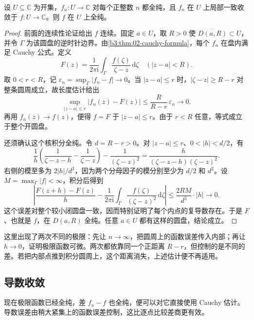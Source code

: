 \begin{proposition}\label{b3:prop:04-holomorphic-limit}
设 \(U\subseteq\mathbb C\) 为开集，\(f_n:U\to\mathbb C\) 对每个正整数 \(n\) 都全纯，且 \(f_n\) 在 \(U\) 上局部一致收敛于 \(f:U\to\mathbb C\)。则 \(f\) 在 \(U\) 上全纯。
\end{proposition}
\begin{proof}
前面的连续性论证给出 \(f\) 连续。固定 \(a\in U\)，取 \(R>0\) 使 \(\overline{D(a,R)}\subset U\)，并令 \(\Gamma\) 为该圆盘的逆时针边界。由\cref{b3:thm:02-cauchy-formula}，每个 \(f_n\) 在盘内满足 Cauchy 公式。定义
\[
 F(z)=\frac1{2\pi\mathrm{i}}\int_\Gamma
              \frac{f(\zeta)}{\zeta-z}\,\mathrm{d}\zeta
 \quad(|z-a|<R).
\]
取 \(0<r<R\)，记 \(\varepsilon_n=\sup_\Gamma|f_n-f|\to0\)。当 \(|z-a|\le r\) 时，\(|\zeta-z|\ge R-r\) 对整条圆周成立，故长度估计给出
\[
 \sup_{|z-a|\le r}|f_n(z)-F(z)|
 \le\frac{R}{R-r}\,\varepsilon_n\longrightarrow0.
\]
再用 \(f_n(z)\to f(z)\)，便得 \(f=F\) 于 \(|z-a|\le r\)。由于 \(r<R\) 任意，等式成立于整个开圆盘。

还须确认这个核积分全纯。令 \(d=R-r>0\)。对 \(|z-a|\le r\)、\(0<|h|<d/2\)，有
\[
 \frac1h\left(\frac1{\zeta-z-h}-\frac1{\zeta-z}\right)
       -\frac1{(\zeta-z)^2}
 =\frac{h}{(\zeta-z-h)(\zeta-z)^2}.
\]
右侧的模至多为 \(2|h|/d^3\)，因为两个分母因子的模分别至少为 \(d/2\) 和 \(d^2\)。设 \(M=\max_\Gamma|f|<\infty\)，积分后得到
\[
 \left|\frac{F(z+h)-F(z)}h
       -\frac1{2\pi\mathrm{i}}\int_\Gamma
                \frac{f(\zeta)}{(\zeta-z)^2}\,\mathrm{d}\zeta\right|
 \le\frac{2RM}{d^3}\cdot|h|\longrightarrow0.
\]
这个误差对整个较小闭圆盘一致，因而特别证明了每个内点的复导数存在。于是 \(F\)、也就是 \(f\)，在 \(D(a,R)\) 全纯。任意 \(a\in U\) 都有这样的圆盘，结论成立。
\end{proof}

这里出现了两次不同的极限：先让 \(n\to\infty\)，把圆周上的函数误差传入内部；再让 \(h\to0\)，证明极限函数可微。两次都依靠同一个正距离 \(R-r\)，但控制的是不同的差。若把内部点推到积分圆周上，这个距离消失，上述估计便不再适用。

\subsection{导数收敛}
\label{b3:subsec:040103}

现在极限函数已经全纯，差 \(f_n-f\) 也全纯，便可以对它直接使用 Cauchy 估计。导数误差由稍大紧集上的函数误差控制，这比逐点比较差商更有效。

